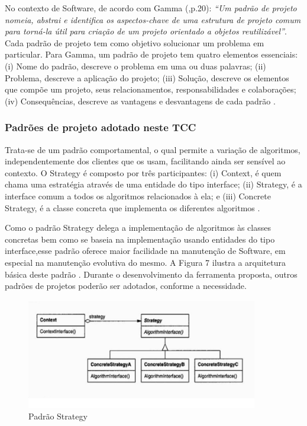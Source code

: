 No contexto de Software, de acordo com Gamma (\citeyear{gamma2000},p.20): \textit{“Um padrão de projeto nomeia, abstrai e identifica os aspectos-chave de uma estrutura de projeto comum para torná-la útil para criação de um projeto orientado a objetos reutilizável”}. Cada padrão de projeto tem como objetivo solucionar um problema em particular. Para Gamma, um padrão de projeto tem quatro elementos essenciais: (i) Nome do padrão, descreve o problema em uma ou duas palavras; (ii) Problema, descreve a aplicação do projeto; (iii) Solução, descreve os elementos que compõe um projeto, seus relacionamentos, responsabilidades e colaborações; (iv) Consequências, descreve as vantagens e desvantagens de cada padrão \cite[p.19]{gamma2000}.

\subsubsection{Padrões de projeto adotado neste TCC}


Trata-se de um padrão comportamental, o qual permite a variação de algoritmos, independentemente dos clientes que os usam, facilitando ainda ser sensível ao contexto. O Strategy é composto por três participantes: (i) Context, é quem chama uma estratégia através de uma entidade do tipo interface; (ii) Strategy, é a interface comum a todos os algoritmos relacionados à ela; e (iii) Concrete Strategy, é a classe concreta que implementa os diferentes algoritmos \cite[p.294]{gamma2000}. 

Como o padrão Strategy delega a implementação de algoritmos às classes concretas bem como se baseia na implementação usando entidades do tipo interface,esse padrão oferece maior facilidade na manutenção de Software, em especial na manutenção evolutiva do mesmo. A Figura 7  ilustra a arquitetura básica deste padrão \cite[p.295]{gamma2000}. Durante o desenvolvimento da ferramenta proposta, outros padrões de projetos poderão ser adotados, conforme a necessidade.

\begin{figure}[h]
\centering
\label{f07}
\includegraphics[width=0.9\textwidth]{figuras/f07}
\caption{Padrão Strategy}

\end{figure}

